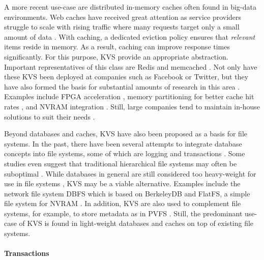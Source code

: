 A more recent use-case are distributed in-memory caches often found in big-data
environments. Web caches have received great attention as service providers
struggle to scale with rising traffic where many requests target only a small
amount of data \cite{xu2014characterizing}. With caching, a dedicated eviction
policy ensures that \emph{relevant} items reside in memory. As a result, caching
can improve response times significantly. For this purpose, KVS provide an
appropriate abstraction. Important representatives of this class are Redis
\cite{redis2017home} and memcached \cite{memcached2017home}. Not only have these
KVS been deployed at companies such as Facebook or Twitter, but they have also
formed the basis for substantial amounts of research in this area
\cite{xu2014characterizing}. Examples include FPGA acceleration
\cite{lavasani2014fpga}, memory partitioning for better cache hit rates
\cite{carra2014memory}, and NVRAM integration \cite{wu2016nvmcached,
malinowski2017using, venkataraman2011consistent}. Still, large companies tend to
maintain in-house solutions to suit their needs \cite{chang2008bigtable,
decandia2007dynamo, lakshman2010cassandra, wang2015hydradb}.

Beyond databases and caches, KVS have also been proposed as a basis for file
systems. In the past, there have been several attempts to integrate database
concepts into file systems, some of which are logging \cite{rosenblum1992design,
tweedie1998journaling} and transactions \cite{seltzer1990transaction,
wright2007extending, spillane2009enabling}. Some studies even suggest that
traditional hierarchical file systems may often be suboptimal
\cite{stein2005stupid, seltzer2009hierarchical}. While databases in general are
still considered too heavy-weight for use in file systems
\cite{seltzer2009hierarchical}, KVS may be a viable alternative. Examples
include the network file system DBFS which is based on BerkeleyDB
\cite{murphy2002design} and FlatFS, a simple file system for NVRAM
\cite{volos2014aerie}. In addition, KVS are also used to complement file
systems, for example, to store metadata as in PVFS \cite{carns2009small}. Still,
the predominant use-case of KVS is found in light-weight databases and caches on
top of existing file systems.


\paragraph{Transactions}

